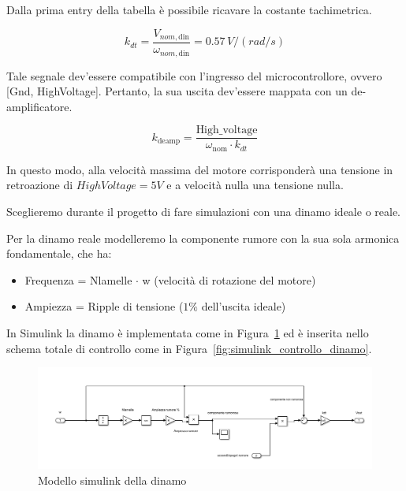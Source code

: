 \documentclass[a4paper,12pt]{article}
\begin{document}
Dalla prima entry della tabella è possibile ricavare la costante tachimetrica.

\[
    k_{dt} = \frac{V_{nom,\text{din}}}{\omega_{nom,\text{din}}} =0.57 \,V/(rad/s)
\]

Tale segnale dev'essere compatibile con l'ingresso del microcontrollore, ovvero [Gnd, HighVoltage]. Pertanto, la sua uscita dev'essere mappata con un de-amplificatore.

\[
    k_{\text{deamp}} = \frac{\text{High\_voltage}}{\omega_{\text{nom}} \cdot k_{dt}}
\]

\vspace{0.3cm}

In questo modo, alla velocità massima del motore corrisponderà una tensione in retroazione di $HighVoltage = 5V$ e a velocità nulla una tensione nulla.

\vspace{0.5cm}
 
Sceglieremo durante il progetto di fare simulazioni con una dinamo ideale o reale.

Per la dinamo reale modelleremo la componente rumore con la sua sola armonica fondamentale, che ha: 

\begin{itemize}
    \item Frequenza = Nlamelle $\cdot$ w (velocità di rotazione del motore)
    \item Ampiezza = Ripple di tensione ($1\%$ dell'uscita ideale)
\end{itemize}

\vspace{0.5cm}

In Simulink la dinamo è implementata come in Figura~\ref{fig:simulink_dinamo} ed è inserita nello schema totale di controllo come in Figura~\ref{fig:simulink_controllo_dinamo}.

\begin{figure}[h!]
\centering
    \includegraphics[scale=0.5]{Immagini/Altre/dinamoSimulink.PNG}
    \caption{Modello simulink della dinamo}
    \label{fig:simulink_dinamo}
\end{figure}
\end{document}
